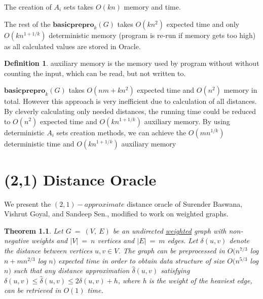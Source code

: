 \documentclass[shortabstract, lic, english]{iithesis}
\theoremstyle{definition} \newtheorem{definition}{Definition}[chapter]
\theoremstyle{remark} \newtheorem{remark}[definition]{Observation}
\theoremstyle{plain} \newtheorem{theorem}[definition]{Theorem}
\theoremstyle{plain} \newtheorem{lemma}[definition]{Lemma}
\theoremstyle{plain} \newtheorem{conjecture}[definition]{Conjecture}
\begin{document}
The creation of $A_i$ sets takes $O(kn)$ memory and time.

The rest of the $\mathbf{basicprepro}_k(G)$ takes $O(kn^2)$ expected time and only \newline
$O(kn^{1 + 1/k})$ deterministic memory (program is re-run if memory gets too high)
as all calculated values are stored in Oracle.

\begin{definition}
    auxiliary memory is the memory used by program without without counting the input, which can be read, but not written to.
\end{definition}

$\mathbf{basicprepro}_k(G)$ takes $O(nm + kn^2)$ expected time and $O(n^2)$ memory in total.
However this approach is very inefficient due to calculation of all distances. By cleverly calculating only needed distances,
the running time could be reduced to $O(n^2)$ expected time and $O(kn^{1 + 1/k})$ auxiliary memory\cite{a0OraclesN2Time}.
By using deterministic $A_i$ sets creation methods,
we can achieve the $O(mn^{1/k})$ deterministic time and $O(kn^{1 + 1/k})$ auxiliary memory\cite{a0OraclesMN1KDeterministicTime}


\chapter{(2,1) Distance Oracle} \label{21DistanceOracle}

We present the $(2,1)-approximate$ distance oracle of Surender Baswana, Vishrut Goyal, and Sandeep Sen.\cite{21OracleBasic},
modified to work on weighted graphs.


\begin{theorem}
    Let $G~=~(V,~E)$ be an undirected \underline{weighted} graph with non-negative weights and $|V|~=~n$ vertices and $|E|~=~m$ edges.
    Let $\delta(u,v)$ denote the distance between vertices $u,v \in V$.
    The graph can be preprocessed in $O(n^{7/3} $ log $ n + mn^{2/3}$ log $ n)$ expected time
    in order to obtain data structure of size $O(n^{5/3} $ log $ n)$ such that any distance approximation
    $\hat{\delta}(u,v)$ satisfying $\delta(u,v)\leq \hat{\delta}(u,v)\leq 2\delta(u, v) + h$, where h is the weight of the heaviest edge,
    can be retrieved in $O(1)$ time.
\end{theorem}
\end{document}

